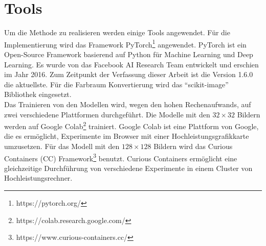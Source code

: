 \section{Tools}
Um die Methode zu realisieren werden einige Tools angewendet. Für die Implementierung wird das Framework 
PyTorch\footnote{https://pytorch.org/} angewendet. PyTorch ist ein Open-Source Framework basierend auf Python für Machine Learning und 
Deep Learning. Es wurde von das Facebook AI Research Team entwickelt und erschien im Jahr 2016. Zum Zeitpunkt der Verfassung dieser Arbeit ist 
die Version 1.6.0 die aktuellste. Für die Farbraum Konvertierung wird das ``scikit-image'' Bibliothek eingesetzt.
\\
Das Trainieren von den Modellen wird, wegen den hohen Rechenaufwands, auf zwei verschiedene Plattformen durchgeführt. Die Modelle mit den
$32 \times 32$ Bildern werden auf Google Colab\footnote{https://colab.research.google.com/} trainiert. Google Colab ist eine Plattform von 
Google, die es ermöglicht, Experimente im Browser mit einer Hochleistungsgrafikkarte umzusetzen. Für das Modell mit den $128 \times 128$ Bildern
wird das Curious Containers (CC) Framework\footnote{https://www.curious-containers.cc/} benutzt. Curious Containers ermöglicht eine 
gleichzeitige Durchführung von verschiedene Experimente in einem Cluster von Hochleistungsrechner.


